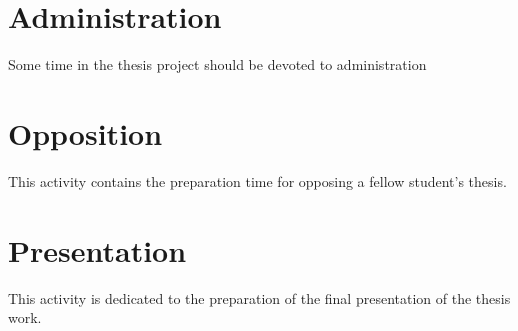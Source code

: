 \section{Administration}
    Some time in the thesis project should be devoted to administration

\section{Opposition}
    This activity contains the preparation time for opposing a fellow student's thesis.

\section{Presentation}
    This activity is dedicated to the preparation of the final presentation of the thesis work.
